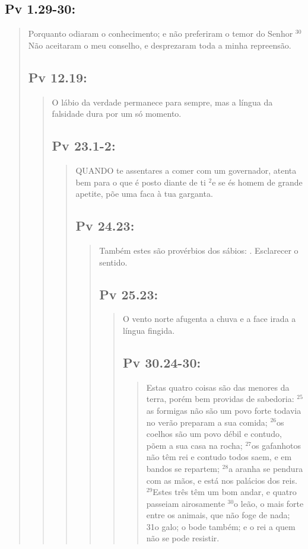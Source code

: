 \subsection{Pv 1.29-30:}
\begin{quote} 
 \small 
Porquanto odiaram o conhecimento; e não preferiram o temor do Senhor\uwave{:} $^{\mathrm{30}}$Não aceitaram o meu conselho, e desprezaram toda a minha repreensão.


\subsection{Pv 12.19:}
 \begin{quote} 
 \small 
 O lábio da verdade permanece para sempre, mas a língua da falsidade\uwave{,} dura por um só momento.


\subsection{Pv 23.1-2:}
 \begin{quote} 
 \small
 QUANDO te assentares a comer com um governador, atenta bem para o que é posto diante de ti\uwave{,} $^{\mathrm{2}}$e se és homem de grande apetite, põe uma faca à tua garganta.


\subsection{Pv 24.23:}
 \begin{quote} 
 Também estes são provérbios dos sábios: .
Esclarecer o sentido.

\subsection{Pv 25.23:}
 \begin{quote} 
 O vento norte afugenta a chuva\uwave{,} e a face irada\uwave{,} a língua fingida.


\subsection{Pv 30.24-30:}
 \begin{quote} 
 Estas quatro coisas são das menores da terra, porém bem providas de sabedoria: $^{\mathrm{25}}$as formigas não são um povo forte\uwave{;} todavia no verão preparam a sua comida; $^{\mathrm{26}}$os coelhos são um povo débil\uwave{;} e contudo, põem a sua casa na rocha; $^{\mathrm{27}}$os gafanhotos não têm rei\uwave{;} e contudo todos saem, e em bandos se repartem; $^{\mathrm{28}}$a aranha se pendura com as mãos, e está nos palácios dos reis. $^{\mathrm{29}}$Estes três têm um bom andar, e quatro passeiam airosamente\uwave{;} $^{\mathrm{30}}$o leão, o mais forte entre os animais, que não foge de nada; 31o galo; o bode também; e o rei a quem não se pode resistir.




\end{quote}
\end{quote}
\end{quote}
\end{quote}
\end{quote}
\end{quote}
